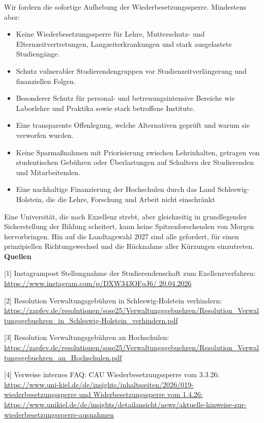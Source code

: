 \documentclass[DIV=calc]{scrartcl}
\let\oldgrqq=\grqq
\def\grqq{\oldgrqq\xspace}
\begin{document}
Wir fordern die sofortige Aufhebung der Wiederbesetzungssperre.
Mindestens aber:
\begin{itemize}
    \item Keine Wiederbesetzungssperre für Lehre, Mutterschutz- und Elternzeitvertretungen, Langzeiterkrankungen und stark ausgelastete Studiengänge.
    \item Schutz vulnerabler Studierendengruppen vor Studienzeitverlängerung und finanziellen Folgen.
    \item Besonderer Schutz für personal- und betreuungsintensive Bereiche wie Laborlehre und Praktika sowie stark betroffene Institute.
    \item Eine transparente Offenlegung, welche Alternativen geprüft und warum sie verworfen wurden.
    \item Keine Sparmaßnahmen mit Priorisierung zwischen Lehrinhalten, getragen von studentischen Gebühren oder Überlastungen auf Schultern der Studierenden und Mitarbeitenden.
    \item Eine nachhaltige Finanzierung der Hochschulen durch das Land Schleswig-Holstein, die die Lehre, Forschung und Arbeit nicht einschränkt
\end{itemize}
Eine Universität, die nach Exzellenz strebt, aber gleichzeitig in grundlegender Sicherstellung der Bildung 
scheitert, kann keine Spitzenforschenden von Morgen hervorbringen. Hin auf die Landtagswahl 2027 sind alle gefordert, für einen prinzipiellen Richtungswechsel und 
die Rücknahme aller Kürzungen einzutreten.\\

\textbf{Quellen}

[1] Instagrampost \glqq Stellungnahme der Studierendenschaft zum Exellenzverfahren\grqq: \url{https://www.instagram.com/p/DXW343OFqJ6/ 20.04.2026}

[2] Resolution \glqq Verwaltungsgebühren in Schleswig-Holstein verhindern\grqq: \url{https://zapfev.de/resolutionen/sose25/Verwaltungsgebuehren/Resolution_Verwaltungsgebuehren_in_Schleswig-Holstein_verhindern.pdf}

[3] Resolution \glqq Verwaltungsgebühren an Hochschulen\grqq: \url{https://zapfev.de/resolutionen/sose25/Verwaltungsgebuehren/Resolution_Verwaltungsgebuehren_an_Hochschulen.pdf}

[4] Verweise internes FAQ: CAU Wiederbesetzungssperre vom 3.3.26: \url{https://www.uni-kiel.de/de/insights/inhaltsseiten/2026/019-wiederbesetzungssperre und Widerbesetzungssperre vom 1.4.26: https://www.unikiel.de/de/insights/detailansicht/news/aktuelle-hinweise-zur-wiederbesetzungssperre-ausnahmen}
\end{document}
